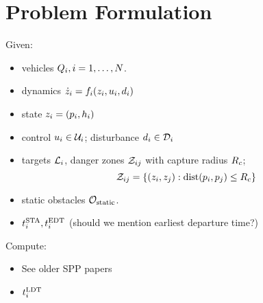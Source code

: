 \section{Problem Formulation \label{sec:formulation}}
Given:
\begin{itemize}
\item vehicles $Q_{i}, i = 1, \ldots, N$.
\item dynamics $\dot{z}_i = f_i(z_i, u_i, d_i)$
\item state $z_i = (p_i, h_i)$
\item control $u_i \in \mathcal{U}_i$; disturbance $d_i \in \mathcal{D}_i$
\item targets $\mathcal{L}_i$, danger zones $\mathcal{Z}_{ij}$ with capture radius $R_c$; 
\begin{equation}
\mathcal{Z}_{ij} = \{(z_i, z_j): \text{dist}(p_i, p_j) \le R_c\}
\end{equation}

\item static obstacles $\mathcal{O}_\text{static}$.
\item $t^\text{STA}_i, t^\text{EDT}_i$ (should we mention earliest departure time?)
\end{itemize}

Compute:
\begin{itemize}
\item See older SPP papers
\item $t^\text{LDT}_i$
\end{itemize}